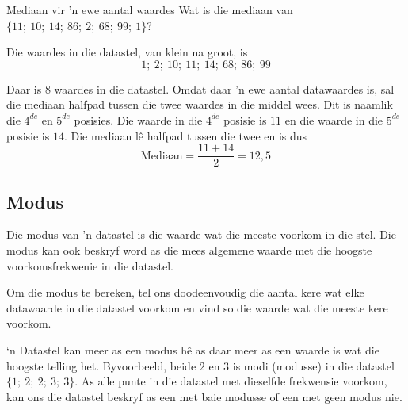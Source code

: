 \begin{wex}{Mediaan vir 'n ewe aantal waardes}
{Wat is die mediaan van $\{11;\ 10;\ 14;\ 86;\ 2;\ 68;\ 99;\ 1\}$?}
{

  Die waardes in die datastel, van klein na groot, is
  \begin{equation*}
    1;\ 2;\ 10;\ 11;\ 14;\ 68;\ 86;\ 99
  \end{equation*}

  Daar is $8$ waardes in die datastel. Omdat daar 'n ewe aantal \newline
datawaardes is, sal die mediaan halfpad tussen die twee waardes in die middel wees. Dit is naamlik die $4^{de}$ en $5^{de}$ posisies. Die waarde in die 
  $4^{de}$ posisie is $11$ en die waarde in die $5^{de}$ posisie is
  $14$. Die mediaan l\^e halfpad tussen die twee en is dus
  \begin{equation*}
    \mbox{Mediaan} = \frac{11+14}{2} = 12,5
  \end{equation*}
}
\end{wex}

\subsection{Modus}
{Die modus van 'n datastel is die waarde wat die meeste voorkom in die stel. Die modus kan ook beskryf word as die mees algemene waarde met die hoogste voorkomsfrekwenie in die datastel.}

Om die modus te bereken, tel ons doodeenvoudig die aantal kere wat elke datawaarde in die datastel voorkom en vind so die waarde wat die meeste kere voorkom.\par

‘n Datastel kan meer as een modus hê as daar meer as een waarde is wat die hoogste telling het. Byvoorbeeld, beide $2$ en $3$ is modi (modusse) in die datastel $\{1;\ 2;\ 2;\ 3;\ 3\}$. As alle punte in die datastel met dieselfde frekwensie voorkom, kan ons die datastel beskryf as een met baie modusse of een met geen modus nie. 


